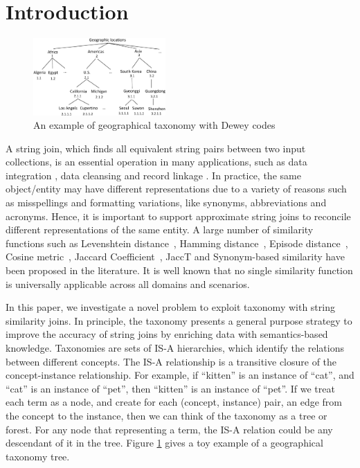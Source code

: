 \section{Introduction}

\begin{figure}[t]
\centering
\includegraphics[width=0.45\textwidth]{figures/taxonomylabels}
 \caption{An example of geographical taxonomy with Dewey codes}
\label{fig:toytaxonomyexample}
\end{figure}


A string join, which finds all equivalent string pairs between two input collections, is an essential operation in many applications, such as  data integration \cite{conf/sigmod/Sarawagi04}, data cleansing \cite{conf/vldb/ArasuGK06,journals/www/LiJM06} and record linkage \cite{books/Winkler99}. In practice, the same object/entity may have different representations  due to a variety of reasons such as misspellings and  formatting variations, like synonyms, abbreviations and acronyms. Hence, it is important to support approximate string joins to reconcile different
representations of the same entity. A large number of  similarity functions such as Levenshtein distance~\cite{conf/sigmod/WangLF12},
Hamming distance~\cite{conf/spire/Kondrak05}, Episode
distance~\cite{conf/ijcai/CohenRF03}, Cosine
metric~\cite{journals/ipm/SaltonB88}, Jaccard
Coefficient~\cite{conf/icde/ChaudhuriGK06,conf/icde/LiLL08}, JaccT \cite{conf/icde/ArasuCK08} and Synonym-based similarity \cite{conf/sigmod/LuLWLW13} have been proposed in the literature. It is well known
that no single similarity function is universally applicable
across all domains and scenarios.

In this paper, we investigate a novel problem to exploit taxonomy with string similarity joins. In principle, the taxonomy presents a general purpose strategy to improve the accuracy of string joins by enriching data with semantics-based knowledge. Taxonomies are sets of IS-A hierarchies, which identify the relations between different concepts. The IS-A relationship
is a transitive closure of the concept-instance relationship.
For example, if ``\textsf{kitten}'' is an instance of ``\textsf{cat}'', and
``\textsf{cat}'' is an instance of ``\textsf{pet}'', then ``\textsf{kitten}'' is an instance
of ``\textsf{pet}''. If we treat each term as a node, and create
for each (concept, instance) pair, an edge from the concept
to the instance, then we can think of the taxonomy as a tree or forest. For any node that representing a term,
the IS-A relation could be any descendant of it in the tree. Figure
\ref{fig:toytaxonomyexample} gives a toy example of a geographical taxonomy tree.

